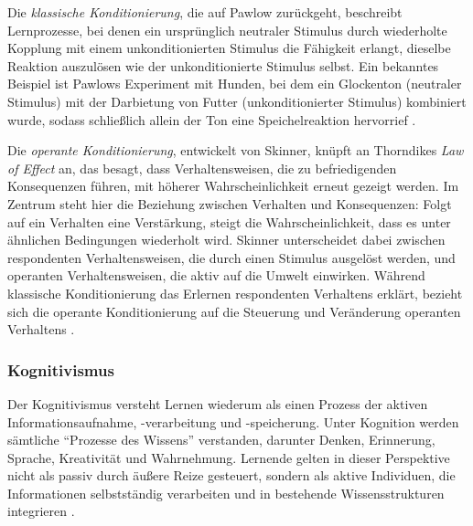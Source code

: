 Die \textit{klassische Konditionierung}, die auf Pawlow zurückgeht, beschreibt Lernprozesse, bei denen ein ursprünglich neutraler Stimulus durch wiederholte Kopplung mit einem unkonditionierten Stimulus die Fähigkeit erlangt, dieselbe Reaktion auszulösen wie der unkonditionierte Stimulus selbst. Ein bekanntes Beispiel ist Pawlows Experiment mit Hunden, bei dem ein Glockenton (neutraler Stimulus) mit der Darbietung von Futter (unkonditionierter Stimulus) kombiniert wurde, sodass schließlich allein der Ton eine Speichelreaktion hervorrief \parencite[S.~7--10]{furstenau_lehr-lern-theorien_2019}.

Die \textit{operante Konditionierung}, entwickelt von Skinner, knüpft an Thorndikes \textit{Law of Effect} an, das besagt, dass Verhaltensweisen, die zu befriedigenden Konsequenzen führen, mit höherer Wahrscheinlichkeit erneut gezeigt werden. Im Zentrum steht hier die Beziehung zwischen Verhalten und Konsequenzen: Folgt auf ein Verhalten eine Verstärkung, steigt die Wahrscheinlichkeit, dass es unter ähnlichen Bedingungen wiederholt wird. Skinner unterscheidet dabei zwischen respondenten Verhaltensweisen, die durch einen Stimulus ausgelöst werden, und operanten Verhaltensweisen, die aktiv auf die Umwelt einwirken. Während klassische Konditionierung das Erlernen respondenten Verhaltens erklärt, bezieht sich die operante Konditionierung auf die Steuerung und Veränderung operanten Verhaltens \parencite[S.~15--17]{furstenau_lehr-lern-theorien_2019}.

\subsubsection{Kognitivismus}

Der Kognitivismus versteht Lernen wiederum als einen Prozess der aktiven Informationsaufnahme, -verarbeitung und -speicherung. Unter Kognition werden sämtliche \enquote{Prozesse des Wissens} verstanden, darunter Denken, Erinnerung, Sprache, Kreativität und Wahrnehmung. Lernende gelten in dieser Perspektive nicht als passiv durch äußere Reize gesteuert, sondern als aktive Individuen, die Informationen selbstständig verarbeiten und in bestehende Wissensstrukturen integrieren \parencite[S.~1]{furstenau_lehr-lern-theorien_2019}.

